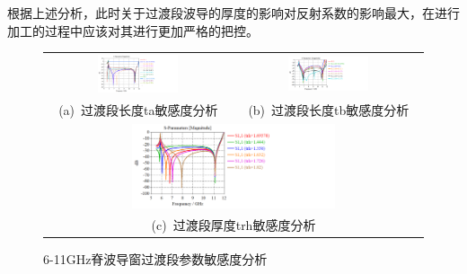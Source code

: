 \documentclass[master]{thesis-uestc}
\begin{document}
根据上述分析，此时关于过渡段波导的厚度的影响对反射系数的影响最大，在进行加工的过程中应该对其进行更加严格的把控。
\begin{figure}[!htbp]
    \small
    \centering
    \begin{tabular}{@{\ }c@{\ }c}
        \includegraphics[width=0.45\textwidth]{pic/chapter3/脊波导窗过渡段长度ta扫参.png} & 
        \hspace{5pt}
        \includegraphics[width=0.45\textwidth]{pic/chapter3/脊波导窗过渡段宽度tb扫参.png}     \\
        \mbox{\small (a) 过渡段长度ta敏感度分析}                                                                               & 
        \mbox{\small (b) 过渡段长度tb敏感度分析}                                                                                  \\[6bp]
        \multicolumn{2}{c}{\includegraphics[width=0.55\textwidth]{pic/chapter3/脊波导窗过渡段厚度trh扫参.png}} \\  %
        \multicolumn{2}{c}{\mbox{\small (c) 过渡段厚度trh敏感度分析}}
    \end{tabular}
    \caption{6-11GHz脊波导窗过渡段参数敏感度分析}
    \label{fig:X频段脊波导窗过渡段参数敏感度分析}
\end{figure}
\end{document}
